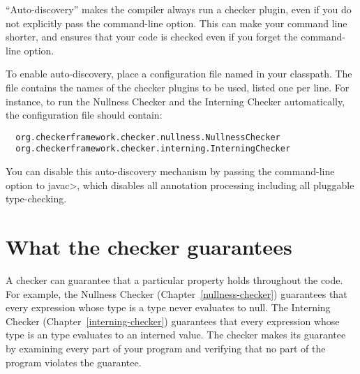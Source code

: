``Auto-discovery'' makes the  compiler always run a checker
plugin, even if you do not explicitly pass the 
command-line option.  This can make your command line shorter, and ensures
that your code is checked even if you forget the command-line option.

\begin{sloppypar}
To enable auto-discovery, place a configuration file named
in your classpath.  The file contains the names of the checker plugins to
be used, listed one per line.  For instance, to run the Nullness Checker and the
Interning Checker automatically, the configuration file should contain:
\end{sloppypar}

\begin{smaller}
\begin{Verbatim}
  org.checkerframework.checker.nullness.NullnessChecker
  org.checkerframework.checker.interning.InterningChecker
\end{Verbatim}
\end{smaller}

You can disable this auto-discovery mechanism by passing the
 command-line option to \<javac>, which disables all
annotation processing including all pluggable type-checking.




\section{What the checker guarantees\label{checker-guarantees}}

A checker can guarantee that a particular property holds throughout the
code.  For example, the Nullness Checker (Chapter~\ref{nullness-checker})
guarantees that every expression whose type is a  type never
evaluates to null.  The Interning Checker (Chapter~\ref{interning-checker})
guarantees that every expression whose type is an  type
evaluates to an interned value.  The checker makes its guarantee by
examining every part of your program and verifying that no part of the
program violates the guarantee.

